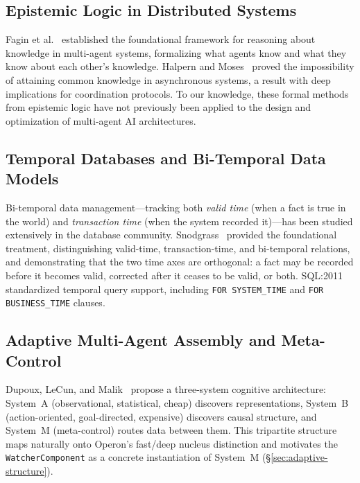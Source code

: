 \subsection{Epistemic Logic in Distributed Systems}

Fagin et al.~\cite{fagin1995reasoning} established the foundational framework for reasoning about knowledge in multi-agent systems, formalizing what agents know and what they know about each other's knowledge. Halpern and Moses~\cite{halpern1990knowledge} proved the impossibility of attaining common knowledge in asynchronous systems, a result with deep implications for coordination protocols. To our knowledge, these formal methods from epistemic logic have not previously been applied to the design and optimization of multi-agent AI architectures.

\subsection{Temporal Databases and Bi-Temporal Data Models}

Bi-temporal data management---tracking both \emph{valid time} (when a fact is true in the world) and \emph{transaction time} (when the system recorded it)---has been studied extensively in the database community. Snodgrass~\cite{snodgrass2000temporal} provided the foundational treatment, distinguishing valid-time, transaction-time, and bi-temporal relations, and demonstrating that the two time axes are orthogonal: a fact may be recorded before it becomes valid, corrected after it ceases to be valid, or both. SQL:2011~\cite{kulkarni2012temporal} standardized temporal query support, including \texttt{FOR SYSTEM\_TIME} and \texttt{FOR BUSINESS\_TIME} clauses.

\subsection{Adaptive Multi-Agent Assembly and Meta-Control}

Dupoux, LeCun, and Malik~\cite{dupoux2026learning} propose a three-system cognitive architecture: System~A (observational, statistical, cheap) discovers representations, System~B (action-oriented, goal-directed, expensive) discovers causal structure, and System~M (meta-control) routes data between them. This tripartite structure maps naturally onto Operon's fast/deep nucleus distinction and motivates the \texttt{WatcherComponent} as a concrete instantiation of System~M (\S\ref{sec:adaptive-structure}).

